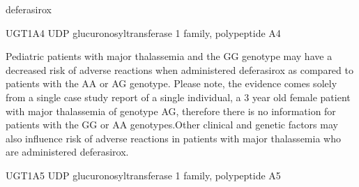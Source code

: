 \documentclass{resume} %
\begin{document}
\begin{rSection}{ deferasirox }
\begin{rSubsection}{ UGT1A4 }{ UDP glucuronosyltransferase 1 family, polypeptide A4 }{}{}
\item[] Pediatric patients with major thalassemia and the GG genotype may have a decreased risk of adverse reactions when administered deferasirox as compared to patients with the AA or AG genotype. Please note, the evidence comes solely from a single case study report of a single individual, a 3 year old female patient with major thalassemia of genotype AG, therefore there is no information for patients with the GG or AA genotypes.Other clinical and genetic factors may also influence risk of adverse reactions in patients with major thalassemia who are administered deferasirox.
\end{rSubsection}\begin{rSubsection}{ UGT1A5 }{ UDP glucuronosyltransferase 1 family, polypeptide A5 }{}{}
\item[]


\end{rSubsection}
\end{rSection}
\end{document}

